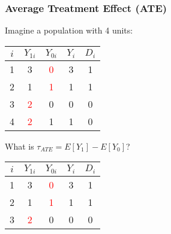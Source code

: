 \documentclass{beamer}
\numberwithin{equation}{section}
\begin{document}
\begin{frame}
  \frametitle{Average Treatment Effect (ATE)}
  \small
Imagine a population with 4 units:\\
\begin{overprint}
\begin{center}
\begin{tabular}{ccccc}
\multicolumn{1}{p{2cm}}{\center $i$} &   \multicolumn{1}{p{1cm}}{\center $Y_{1i}$} & \multicolumn{1}{p{1cm}}{\center $Y_{0i}$}&    \multicolumn{1}{p{1cm}}{\center $Y_{i}$} &   \multicolumn{1}{p{1cm}}{\center $D_{i}$} \\
\hline
\rowcolor{gray!10}        1 &          3 &        \textcolor{red}{0} &         3 &          1  \\
\rowcolor{gray!10}         2 &         1 &       \textcolor{red}{1} &          1 &          1   \\
\rowcolor{gray!30}         3 &          \textcolor{red}{2} &         0 &          0 &          0  \\
\rowcolor{gray!30}         4 &          \textcolor{red}{2} &         1 &          1 &          0  \\
\end{tabular}
\end{center}\bigskip
What is $\tau_{ATE}=E[Y_1] -E[Y_0]$?
\begin{center}
\begin{tabular}{ccccc}
\multicolumn{1}{p{2cm}}{\center $i$} &   \multicolumn{1}{p{1cm}}{\center $Y_{1i}$} & \multicolumn{1}{p{1cm}}{\center $Y_{0i}$}&    \multicolumn{1}{p{1cm}}{\center $Y_{i}$} &   \multicolumn{1}{p{1cm}}{\center $D_{i}$}  \\
\hline
\rowcolor{gray!10}        1 &          3 &        \textcolor{red}{0} &          3 &          1  \\
\rowcolor{gray!10}         2 &         1 &       \textcolor{red}{1} &          1 &          1   \\
\rowcolor{gray!30}         3 &          \textcolor{red}{2} &         0 &          0 &          0 \\

\end{tabular}
\end{center}
\end{overprint}
\end{frame}
\end{document}
